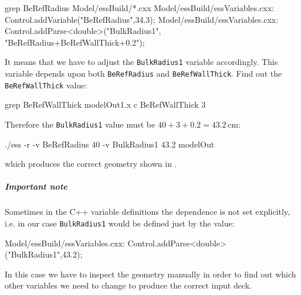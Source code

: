 \begin{bash}
 grep BeRefRadius Model/essBuild/*.cxx
 Model/essBuild/essVariables.cxx:  Control.addVariable("BeRefRadius",34.3);
 Model/essBuild/essVariables.cxx:  Control.addParse<double>("BulkRadius1",
                                                   "BeRefRadius+BeRefWallThick+0.2");
\end{bash}
It means that we have to adjust the {\tt BulkRadius1} variable accordingly. This variable depends upon both {\tt BeRefRadius} and {\tt BeRefWallThick}.
Find out the {\tt BeRefWallThick} value:
\begin{bash}
  grep BeRefWallThick modelOut1.x
  c BeRefWallThick 3
\end{bash}
Therefore the {\tt BulkRadius1} value must be $40+3+0.2=43.2$\,cm:
\begin{bash}
 ./ess -r -v BeRefRadius 40 -v BulkRadius1 43.2 modelOut
\end{bash}
which produces the correct geometry shown in .

\subparagraph{Important note} Sometimes in the C++ variable definitions the dependence is not set explicitly, i.e. in our case {\tt BulkRadius1} would be defined just by the value:
\begin{bash}
 Model/essBuild/essVariables.cxx:  Control.addParse<double>("BulkRadius1",43.2);
\end{bash}
In this case we have to inspect the geometry manually in order to find out which other variables we need to change to produce the correct input deck.
